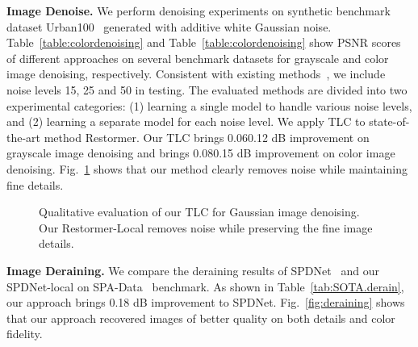 \documentclass[runningheads]{llncs}
\begin{document}
 \textbf{Image Denoise.} We perform denoising experiments on synthetic benchmark dataset Urban100~\cite{huang2015single} generated with additive white Gaussian noise.
Table~\ref{table:colordenoising} and Table~\ref{table:colordenoising} show PSNR scores of different approaches on several benchmark datasets for grayscale and color image denoising, respectively. Consistent with existing methods~\cite{zhang2021plug,liang2021swinir,zamir2021restormer}, we include noise levels 15, 25 and 50 in testing. The evaluated methods are divided into two experimental categories: (1) learning a single model to handle various noise levels, and (2) learning a separate model for each noise level. We apply TLC to state-of-the-art method Restormer. Our TLC brings 0.060.12 dB improvement on grayscale image denoising and brings 0.080.15 dB improvement on color image denoising. Fig.~\ref{fig:denoise} shows that our method clearly removes noise while maintaining fine details.
\begin{figure}[!t]
\centering
{}
\caption{Qualitative evaluation of our TLC for Gaussian image denoising. Our Restormer-Local removes noise while preserving the fine image details.}
\label{fig:denoise}
\end{figure}

 
\textbf{Image Deraining.}
We compare the deraining results of SPDNet~\cite{fang2020multi} and our SPDNet-local on SPA-Data~\cite{wang2019spatial} benchmark.
As shown in Table~\ref{tab:SOTA.derain}, our approach brings 0.18 dB improvement to SPDNet. Fig.~\ref{fig:deraining} shows that our approach recovered images of better quality on both details and color fidelity.
\end{document}
